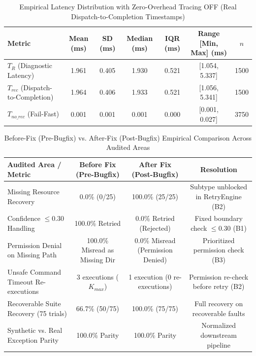 \begin{table}[htbp]
\centering
\caption{Empirical Latency Distribution with Zero-Overhead Tracing OFF (Real Dispatch-to-Completion Timestamps)}
\label{tab:latency_breakdown}
\begin{tabular}{lcccccc}
\hline
\textbf{Metric} & \textbf{Mean (ms)} & \textbf{SD (ms)} & \textbf{Median (ms)} & \textbf{IQR (ms)} & \textbf{Range [Min, Max] (ms)} & \textbf{$n$} \\
\hline
$T_R$ (Diagnostic Latency) & 1.961 & 0.405 & 1.930 & 0.521 & [1.054, 5.337] & 1500 \\
$T_{rec}$ (Dispatch-to-Completion) & 1.964 & 0.406 & 1.933 & 0.521 & [1.056, 5.341] & 1500 \\
$T_{no\_rec}$ (Fail-Fast) & 0.001 & 0.001 & 0.001 & 0.000 & [0.001, 0.027] & 3750 \\
\hline
\end{tabular}
\end{table}

\begin{table}[htbp]
\centering
\caption{Before-Fix (Pre-Bugfix) vs. After-Fix (Post-Bugfix) Empirical Comparison Across Audited Areas}
\label{tab:before_after_comparison}
\begin{tabular}{lccc}
\hline
\textbf{Audited Area / Metric} & \textbf{Before Fix (Pre-Bugfix)} & \textbf{After Fix (Post-Bugfix)} & \textbf{Resolution} \\
\hline
Missing Resource Recovery & 0.0\% (0/25) & 100.0\% (25/25) & Subtype unblocked in RetryEngine (B2) \\
Confidence $\le 0.30$ Handling & 100.0\% Retried & 0.0\% Retried (Rejected) & Fixed boundary check $\le 0.30$ (B1) \\
Permission Denial on Missing Path & 100.0\% Misread as Missing Dir & 0.0\% Misread (Permission Denied) & Prioritized permission check (B3) \\
Unsafe Command Timeout Re-executions & 3 executions ($K_{max}$) & 1 execution (0 re-executions) & Permission re-check before retry (B2) \\
Recoverable Suite Recovery (75 trials) & 66.7\% (50/75) & 100.0\% (75/75) & Full recovery on recoverable faults \\
Synthetic vs. Real Exception Parity & 100.0\% Parity & 100.0\% Parity & Normalized downstream pipeline \\
\hline
\end{tabular}
\end{table}